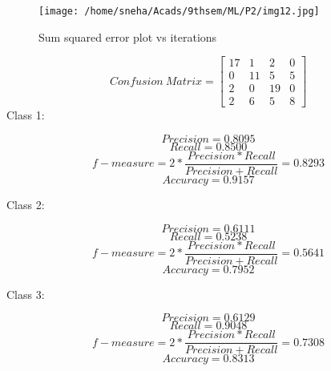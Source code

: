 \documentclass[12pt]{article}
\begin{document}
\begin{itemize}
{\begin{figure}
	\centering
		\texttt{[image: /home/sneha/Acads/9thsem/ML/P2/img12.jpg]}
	\caption{Sum squared error plot vs iterations}
	
\end{figure}

\begin{equation}
Confusion\ Matrix = \begin{bmatrix} 17  & 1 & 2 & 0\\ 0 & 11 & 5 & 5 \\ 2 & 0 & 19 & 0 \\ 2 & 6 & 5 & 8 \end{bmatrix}
\end{equation}
Class 1:

\begin{equation}
Precision = 0.8095
\end{equation}
\begin{equation}
Recall = 0.8500
\end{equation}
\begin{equation}
f-measure = 2*\frac{Precision*Recall}{Precision + Recall} = 0.8293
\end{equation}
\begin{equation}
Accuracy = 0.9157
\end{equation}

Class 2:

\begin{equation}
Precision = 0.6111
\end{equation}
\begin{equation}
Recall = 0.5238
\end{equation}
\begin{equation}
f-measure = 2*\frac{Precision*Recall}{Precision + Recall} = 0.5641
\end{equation}
\begin{equation}
Accuracy = 0.7952
\end{equation}

Class 3:

\begin{equation}
Precision = 0.6129
\end{equation}
\begin{equation}
Recall = 0.9048
\end{equation}
\begin{equation}
f-measure = 2*\frac{Precision*Recall}{Precision + Recall} = 0.7308
\end{equation}
\begin{equation}
Accuracy = 0.8313
\end{equation}

}
\end{itemize}
\end{document}
